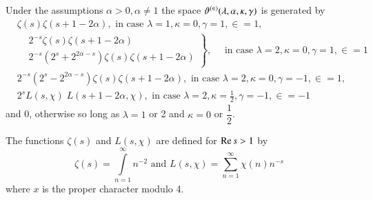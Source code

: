 \begin{thm}\label{chap5:thm36}
Under the assumptions $\alpha > 0, \alpha \neq 1$ the space
$\vartheta^{(\in)}(\lambda, \alpha,\break \kappa, \gamma)$ is
generated by 
\begin{align*}
& \zeta (s) \zeta (s+1-2\alpha), \text{ in case } \lambda =1, \kappa =
0, \gamma = 1, \in = 1,\\
& \left.
  \begin{aligned}
& 2^{-s} \zeta(s) \zeta (s+1-2\alpha)\\
& 2^{-s}(2^s+2^{2\alpha-s})\zeta(s) \zeta(s+1-2\alpha) 
  \end{aligned}
\right\}, \quad \text{ in case } \lambda =2, \kappa =0, \gamma=1,
\in =1 \\
& 2^{-s} (2^s - 2^{2\alpha-s}) \zeta(s) \zeta(s+1-2\alpha), \text{ in
  case } \lambda=2, \kappa=0, \gamma = -1, \in =1,\\
& 2^sL(s,\chi) \; L(s+1-2\alpha,\chi), \text{ in case } \lambda = 2,
\kappa =\frac{1}{2}, \gamma=-1, \in = -1
\end{align*}
and 0, otherwise so long as $\lambda=1$ or 2 and $\kappa=0$ or
$\dfrac{1}{2}$.

The functions $\zeta(s)$ and $L(s,\chi)$ are defined for $\operatorname{Re} s>1$ by
$$
\zeta(s) = \int\limits^{\infty}_{n=1} n^{-2} \text{ and } L(s,\chi) =
\sum^{\infty}_{n=1} \chi(n) n^{-s}
$$
where $x$ is the proper character modulo 4.
\end{thm}


